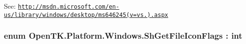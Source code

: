See\-: \href{http://msdn.microsoft.com/en-us/library/windows/desktop/ms646245(v=vs.85).aspx}{\tt http\-://msdn.\-microsoft.\-com/en-\/us/library/windows/desktop/ms646245(v=vs.).\-aspx} \hypertarget{namespace_open_t_k_1_1_platform_1_1_windows_a515477a6b134fd1e396a53beb66b9f88}{
\subsubsection[{Sh\-Get\-File\-Icon\-Flags}]{\setlength{\rightskip}{0pt plus 5cm}enum {\bf Open\-T\-K.\-Platform.\-Windows.\-Sh\-Get\-File\-Icon\-Flags} \-: int}}\label{namespace_open_t_k_1_1_platform_1_1_windows_a515477a6b134fd1e396a53beb66b9f88}
